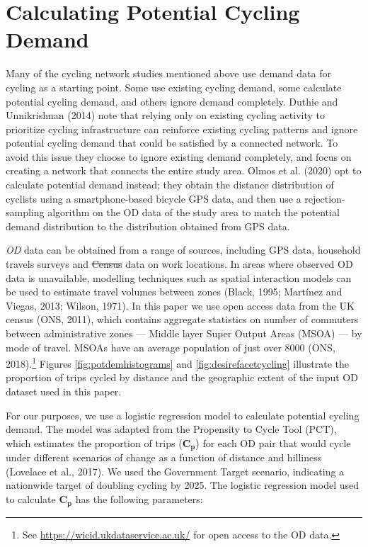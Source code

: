 \documentclass[
]{article}
\providecommand{\DIFaddtex}[1]{{\protect\color{blue}\uwave{#1}}} %
\providecommand{\DIFdeltex}[1]{{\protect\color{red}\sout{#1}}}                      %
\providecommand{\DIFaddbegin}{} %
\providecommand{\DIFaddend}{} %
\providecommand{\DIFdelbegin}{} %
\providecommand{\DIFdelend}{} %
\providecommand{\DIFadd}[1]{\texorpdfstring{\DIFaddtex{#1}}{#1}} %
\providecommand{\DIFdel}[1]{\texorpdfstring{\DIFdeltex{#1}}{}} %
\newcommand{\DIFscaledelfig}{0.5}
\newlength{\DIFdelgraphicswidth} %
\newlength{\DIFdelgraphicsheight} %
\newcommand{\DIFaddincludegraphics}[2][]{{\color{blue}\fbox{\DIFOincludegraphics[#1]{#2}}}} %
\newcommand{\DIFdelincludegraphics}[2][]{%
\sbox{\DIFdelgraphicsbox}{\DIFOincludegraphics[#1]{#2}}%
\settoboxwidth{\DIFdelgraphicswidth}{\DIFdelgraphicsbox} %
\settoboxtotalheight{\DIFdelgraphicsheight}{\DIFdelgraphicsbox} %
\scalebox{\DIFscaledelfig}{%
\parbox[b]{\DIFdelgraphicswidth}{\usebox{\DIFdelgraphicsbox}\\[-\baselineskip] \rule{\DIFdelgraphicswidth}{0em}}\llap{\resizebox{\DIFdelgraphicswidth}{\DIFdelgraphicsheight}{%
\setlength{\unitlength}{\DIFdelgraphicswidth}%
\begin{picture}(1,1)%
\thicklines\linethickness{2pt} %
{\color[rgb]{1,0,0}\put(0,0){\framebox(1,1){}}}%
{\color[rgb]{1,0,0}\put(0,0){\line( 1,1){1}}}%
{\color[rgb]{1,0,0}\put(0,1){\line(1,-1){1}}}%
\end{picture}%
}\hspace*{3pt}}} %
} %
\DeclareRobustCommand{\DIFaddbegin}{\DIFOaddbegin \let\includegraphics\DIFaddincludegraphics} %
\DeclareRobustCommand{\DIFaddend}{\DIFOaddend \let\includegraphics\DIFOincludegraphics} %
\DeclareRobustCommand{\DIFdelbegin}{\DIFOdelbegin \let\includegraphics\DIFdelincludegraphics} %
\DeclareRobustCommand{\DIFdelend}{\DIFOaddend \let\includegraphics\DIFOincludegraphics} %
\begin{document}
\hypertarget{calculating-potential-cycling-demand}{%
\section{Calculating Potential Cycling Demand}\label{calculating-potential-cycling-demand}}

Many of the cycling network studies mentioned above use demand data for cycling as a starting point.
Some use existing cycling demand, some calculate potential cycling demand, and others ignore demand completely.
Duthie and Unnikrishnan (2014) note that relying only on existing cycling activity to prioritize cycling
infrastructure can reinforce existing cycling patterns and ignore potential cycling demand that could be satisfied by a connected network.
To avoid this issue they choose to ignore existing demand completely, and focus on creating a network that connects the
entire study area.
Olmos et al. (2020) opt to calculate potential demand instead; they obtain the distance distribution of cyclists using a smartphone-based bicycle GPS data, and then use a rejection-sampling algorithm on the OD data of the study area to match
the potential demand distribution to the distribution obtained from GPS data.

\emph{OD} data can be obtained from a range of sources,
including GPS data, household travels surveys and \DIFdelbegin \DIFdel{Census }\DIFdelend \DIFaddbegin \DIFadd{census }\DIFaddend data on work
locations. In areas where observed OD data is unavailable, modelling
techniques such as spatial interaction models can be used to estimate
travel volumes between zones (Black, 1995; Martínez and Viegas, 2013; Wilson, 1971). In this paper we use open access data from the UK
census (ONS, 2011), which contains aggregate statistics on
number of commuters between administrative zones --- Middle layer Super
Output Areas (MSOA) --- by mode of travel. MSOAs have an average
population of just over 8000 (ONS, 2018).\footnote{ See
  \url{https://wicid.ukdataservice.ac.uk/} for open access to the OD data.}
Figures \ref{fig:potdemhistograms} and \ref{fig:desirefacetcycling}
illustrate the proportion of trips cycled by distance and the
geographic extent of the input OD dataset used in this paper.

For our purposes, we use a logistic regression model to calculate
potential cycling demand. The model was adapted from the Propensity to
Cycle Tool (PCT), which estimates the proportion of trips
(\(\boldsymbol{C_{p}}\)) for each OD pair that would cycle under
different scenarios of change as a
function of distance and hilliness (Lovelace et al., 2017). We used the Government Target scenario,
indicating a nationwide target of doubling cycling by 2025. The
logistic regression model used to calculate \(\boldsymbol{C_{p}}\) has
the following parameters:
\end{document}
